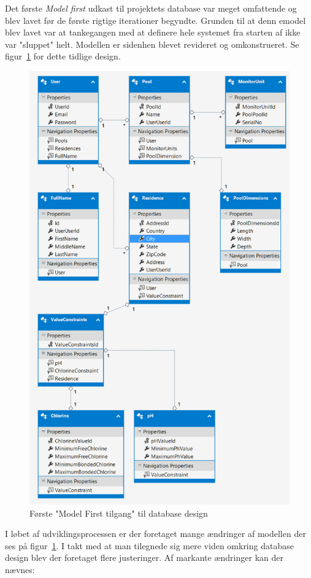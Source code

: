 Det første \textit{Model first} udkast til projektets database var meget omfattende og blev lavet før de første rigtige iterationer begyndte. Grunden til at denn emodel blev lavet var at tankegangen med at definere hele systemet fra starten af ikke var "sluppet" helt. Modellen er sidenhen blevet revideret og omkonstrueret. Se figur~\ref{fig:databaseERD_firstattempt_uml} for dette tidlige design.

\begin{figure}[H]
	\centering
	\includegraphics[width=0.8\linewidth]{figs/design/databaseERD}
	\caption{Første "Model First tilgang" til database design}
	\label{fig:databaseERD_firstattempt_uml}
\end{figure}

I løbet af udviklingsprocessen er der foretaget mange ændringer af modellen der ses på figur~\ref{fig:databaseERD_firstattempt_uml}. 
I takt med at man tilegnede sig mere viden omkring database design blev der foretaget flere justeringer. Af markante ændringer kan der nævnes:

